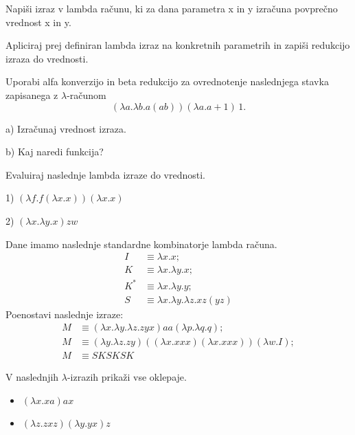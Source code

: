 \begin{ex}
Napi\v si izraz v lambda ra\v cunu, ki za dana parametra x in y izra\v cuna povpre\v cno vrednost x in y.

Apliciraj prej definiran lambda izraz na konkretnih parametrih in zapi\v si redukcijo izraza do vrednosti.
\end{ex}




\begin{ex}
Uporabi alfa konverzijo in beta redukcijo za ovrednotenje naslednjega stavka zapisanega z $\lambda$-ra\v cunom
$$(\lambda a.\lambda b.a (a b)) (\lambda a.a + 1)\,1.$$

a) Izra\v cunaj vrednost izraza.

b) Kaj naredi funkcija?
\end{ex}




\begin{ex}
Evaluiraj naslednje lambda izraze do vrednosti.

1) $( \lambda f.f( \lambda x.x))( \lambda x.x) $

2) $( \lambda x. \lambda y.x) z w$

\end{ex}



\begin{ex}
Dane imamo naslednje standardne kombinatorje lambda ra\v cuna.
\begin{align*}
I& \equiv \lambda x.x;\\
K& \equiv \lambda x.\lambda y.x;\\
K^*& \equiv \lambda x.\lambda y.y;\\
S& \equiv \lambda x. \lambda y.\lambda z.xz(yz)
\end{align*}
Poenostavi naslednje izraze:
\begin{align*}
M &\equiv (\lambda x.\lambda y.\lambda z.zyx)aa(\lambda p.\lambda q.q);\\
M &\equiv (\lambda y.\lambda z.zy)((\lambda x.xxx)(\lambda x.xxx))(\lambda w.I);\\
M &\equiv SKSKSK
\end{align*}
\end{ex}



\begin{ex}
V naslednjih $\lambda$-izrazih prika\v zi vse oklepaje.  
\begin{itemize}
\item $(\lambda x.xa)ax$ 
\item $(\lambda z.zxz)(\lambda y.yx)z$ 
\end{itemize}
\end{ex}




